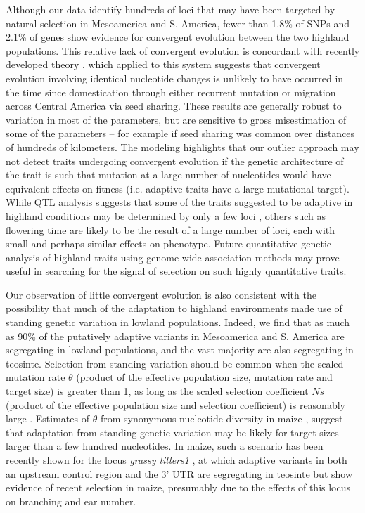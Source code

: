 Although our data identify hundreds of loci that may have been targeted by natural selection in Mesoamerica and S. America, 
fewer than 1.8\% of SNPs and 2.1\% of genes show evidence for convergent evolution between the two highland populations.
This relative lack of convergent evolution is concordant with recently developed theory \citep{ralph2014convergent},
which applied to this system suggests that convergent evolution involving identical nucleotide changes 
is unlikely to have occurred in the time since domestication through either recurrent mutation or migration across Central America via seed sharing.   
These results are generally robust to variation in most of the parameters, but are sensitive to gross misestimation of some of the parameters -- for example if seed sharing was common over distances of hundreds of kilometers.  
The modeling highlights that our outlier approach may not detect traits undergoing convergent evolution 
if the genetic architecture of the trait is such that mutation at a large number of nucleotides would have equivalent effects on fitness 
(i.e. adaptive traits have a large mutational target). 
While QTL analysis suggests that some of the traits suggested to be adaptive in highland conditions may be determined by only a few loci \citep{Lauter_2004_15342532}, 
others such as flowering time \citep{buckler2009genetic} are likely to be the result of a large number of loci, each with small and perhaps similar effects on phenotype.  
Future quantitative genetic analysis of highland traits using genome-wide association methods may prove useful in searching for the signal of selection on such highly quantitative traits. 

Our observation of little convergent evolution is also consistent with the possibility that much of the adaptation to highland environments made use of standing genetic variation in lowland populations. 
Indeed, we find that as much as 90\% of the putatively adaptive variants in Mesoamerica and S. America are segregating in lowland populations, 
and the vast majority are also segregating in teosinte.  
Selection from standing variation should be common when the scaled mutation rate $\theta$ 
(product of the effective population size, mutation rate and target size) is greater than 1,
as long as the scaled selection coefficient $Ns$ 
(product of the effective population size and selection coefficient) is reasonably large \cite[]{Hermisson_2005_15716498}.
Estimates of $\theta$ from synonymous nucleotide diversity in maize  \citep{Tenaillon_2004_15014173,Wright_2005_15919994,Ross-Ibarra_2009_19153259}, 
suggest that adaptation from standing genetic variation may be likely for target sizes larger than a few hundred nucleotides.
In maize, such a scenario has been recently shown for the locus \emph{grassy tillers1} \cite[]{Wills_2013_23825971}, at which adaptive variants in both an upstream control region and the 3' UTR are segregating in teosinte but show evidence of recent selection in maize, presumably due to the effects of this locus on branching and ear number.

